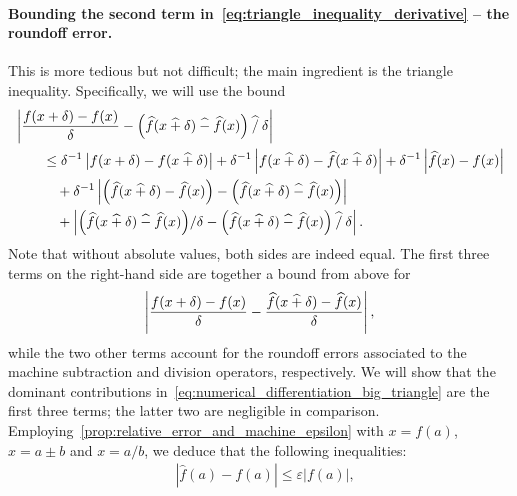 \begin{solution}
    \paragraph{Bounding the second term in~\eqref{eq:triangle_inequality_derivative} -- the roundoff error.}
    This is more tedious but not difficult;
    the main ingredient is the triangle inequality.
    Specifically, we will use the bound
    \begin{align}
        \nonumber
        &\left\lvert \frac{f(x + \delta) - f(x)}{\delta} - \Bigl(\widehat f(x \mathbin{\widehat +} \delta) \mathbin{\widehat -} \widehat f(x)\Bigr) \mathbin{\widehat /} \delta \right\rvert \\
        \nonumber
        &\qquad \leq \delta^{-1}\left\lvert f(x+ \delta) - f(x\mathbin{\widehat +} \delta)  \right\rvert
         + \delta^{-1} \left\lvert f(x\mathbin{\widehat +} \delta) - \widehat f(x \mathbin{\widehat +} \delta)  \right\rvert
         + \delta^{-1} \left\lvert \widehat f(x) - f(x)  \right\rvert \\
        \nonumber
        &\qquad \quad + \delta^{-1} \left\lvert \Bigl(\widehat f(x \mathbin{\widehat +} \delta) - \widehat f(x)\Bigr) - \Bigl(\widehat f(x \mathbin{\widehat +} \delta) \mathbin{\widehat -} \widehat f(x)\Bigr) \right\rvert  \\
        \label{eq:numerical_differentiation_big_triangle}
        &\qquad \quad + \left\lvert \Bigl(\widehat f(x \mathbin{\widehat +} \delta) \mathbin{\widehat -} \widehat f(x)\Bigr) / \delta - \Bigl(\widehat f(x \mathbin{\widehat +} \delta) \mathbin{\widehat -} \widehat f(x)\Bigr) \mathbin{\widehat /} \delta \right\rvert.
    \end{align}
    Note that without absolute values,
    both sides are indeed equal.
    The first three terms on the right-hand side are together a bound from above for
    \begin{equation}
        \label{eq:bound_above_first_three_terms}
        \left\lvert \frac{f(x+\delta) - f(x) }{\delta} - \frac{ \widehat f(x\mathbin{\widehat +}\delta) - \widehat f(x) }{\delta} \right\rvert,
    \end{equation}
    while the two other terms account for the roundoff errors associated to the machine subtraction and division operators,
    respectively.
    We will show that the dominant contributions in~\eqref{eq:numerical_differentiation_big_triangle} are the first three terms;
    the latter two are negligible in comparison.
    Employing~\cref{prop:relative_error_and_machine_epsilon} with $x = f(a)$,
    $x = a \pm b$ and $x = a/b$,
    we deduce that the following inequalities:
    \begin{align}
        \label{eq:inequalities_numerical_differentiation}
        &\left\lvert \widehat f(a) - f(a) \right\rvert \leq \varepsilon \lvert f(a) \rvert,

\end{align}
\end{solution}
